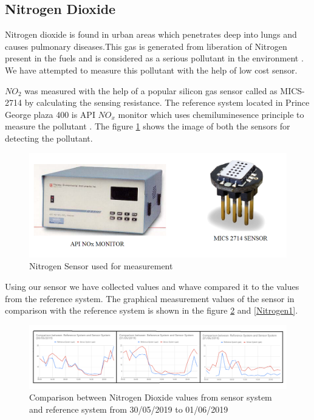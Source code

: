    \subsection{Nitrogen Dioxide}

 Nitrogen dioxide is found in urban areas which penetrates deep into lungs and causes pulmonary diseases.This gas is generated from liberation of Nitrogen present in the fuels and is considered as a serious pollutant in the environment \cite{Salonen2019} \cite{govcanada}. We have attempted to measure this pollutant with the help of low cost sensor. 
 
 $NO_{2}$ was measured with the help of a popular silicon gas sensor called as MICS-2714 by calculating the sensing resistance. The reference system located in Prince George plaza 400 is API $NO_{x}$ monitor \cite{Environment2010} which uses chemiluminesence principle to measure the pollutant . The figure \ref{Nitrogensensor} shows the image of both the sensors for detecting the pollutant.
   
   
   \begin{figure}[h]
    \begin{center}
    \includegraphics[scale=0.70]{images/figure31.png}
    \end{center}
    \caption{Nitrogen Sensor used for measurement}
  \label{Nitrogensensor}
\end{figure}
   
   
   
Using our sensor we have collected values and whave compared it to the values from the reference system. The graphical measurement values of the sensor in comparison with the reference system is shown in  the figure \ref{Nitrogen} and \ref{Nitrogen1}. 


   \begin{figure}[h]
      \begin{center}
      \includegraphics[scale=0.70]{images/figure23.png}
      \end{center}
      \caption{Comparison between Nitrogen Dioxide values from sensor system and reference system from 30/05/2019 to 01/06/2019}
    \label{Nitrogen}
  \end{figure}


